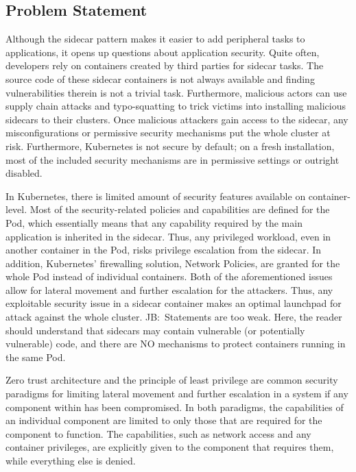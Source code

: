 \documentclass[english, 12pt, a4paper, sci, utf8, a-2b, online]{aaltothesis}
\newcommand{\mycomment}[3]{\textcolor{#1}{#2:~#3}}
\newcommand{\jb}[1]{\noindent\mycomment{aaltoRed}{JB}{#1}}
\begin{document}
\subsection{Problem Statement}

Although the sidecar pattern makes it easier to add peripheral tasks to applications, it opens up questions about application security.
Quite often, developers rely on containers created by third parties for sidecar tasks.
The source code of these sidecar containers is not always available and finding vulnerabilities therein is not a trivial task.
Furthermore, malicious actors can use supply chain attacks and typo-squatting to trick victims into installing malicious sidecars to their clusters.
Once malicious attackers gain access to the sidecar, any misconfigurations or permissive security mechanisms put the whole cluster at risk.
Furthermore, Kubernetes is not secure by default; on a fresh installation, most of the included security mechanisms are in permissive settings or outright disabled.

In Kubernetes, there is limited amount of security features available on container-level.
Most of the security-related policies and capabilities are defined for the Pod, which essentially means that any capability required by the main application is inherited in the sidecar.
Thus, any privileged workload, even in another container in the Pod, risks privilege escalation from the sidecar.
In addition, Kubernetes' firewalling solution, Network Policies, are granted for the whole Pod instead of individual containers.
Both of the aforementioned issues allow for lateral movement and further escalation for the attackers.
Thus, any exploitable security issue in a sidecar container makes an optimal launchpad for attack against the whole cluster.
\jb{Statements are too weak. Here, the reader should understand that sidecars may contain vulnerable (or potentially vulnerable) code, and there are NO mechanisms to protect containers running in the same Pod.}

Zero trust architecture and the principle of least privilege are common security paradigms for limiting lateral movement and further escalation in a system if any component within has been compromised.
In both paradigms, the capabilities of an individual component are limited to only those that are required for the component to function.
The capabilities, such as network access and any container privileges, are explicitly given to the component that requires them, while everything else is denied.
\end{document}
